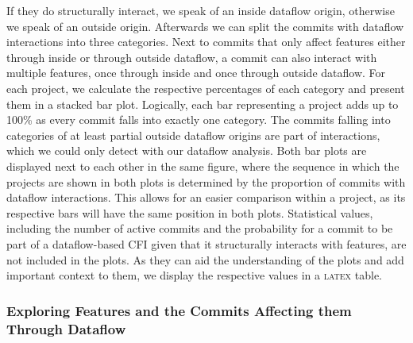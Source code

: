 If they do structurally interact, we speak of an inside dataflow origin, otherwise we speak of an outside origin.
Afterwards we can split the commits with dataflow interactions into three categories.
Next to commits that only affect features either through inside or through outside dataflow, a commit can also interact with multiple features, once through inside and once through outside dataflow.
For each project, we calculate the respective percentages of each category and present them in a stacked bar plot.
Logically, each bar representing a project adds up to 100\% as every commit falls into exactly one category.
The commits falling into categories of at least partial outside dataflow origins are part of interactions, which we could only detect with our dataflow analysis.
Both bar plots are displayed next to each other in the same figure, where the sequence in which the projects are shown in both plots is determined by the proportion of commits with dataflow interactions.
This allows for an easier comparison within a project, as its respective bars will have the same position in both plots.
Statistical values, including the number of active commits and the probability for a commit to be part of a dataflow-based CFI given that it structurally interacts with features, are not included in the plots.
As they can aid the understanding of the plots and add important context to them, we display the respective values in a \textsc{latex} table.

\subsubsection*{Exploring Features and the Commits Affecting them Through Dataflow}

